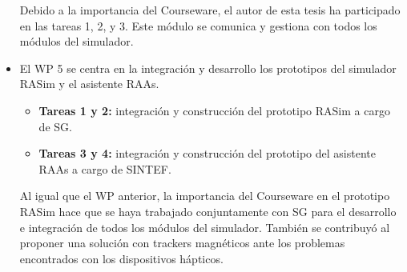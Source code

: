 \begin{itemize}
Debido a la importancia del \ac{Courseware}, el autor de esta tesis ha participado en las tareas 1, 2, y 3. Este módulo se comunica y gestiona con todos los módulos del simulador.%


\item
El \ac{WP} 5 se centra en la integración y desarrollo los prototipos del simulador \ac{RASim} y el asistente \ac{RAAs}. %
\begin{itemize}
    \item {\textbf{Tareas 1 y 2: } integración y construcción del prototipo \ac{RASim} a cargo de \ac{SG}. 
    }
     \item {\textbf{Tareas 3 y 4: } integración y construcción del prototipo del asistente \ac{RAAs} a cargo de \ac{SINTEF}.
    }
\end{itemize}

{Al igual que el \ac{WP} anterior, la importancia del \ac{Courseware} en el prototipo \ac{RASim} hace que se haya trabajado conjuntamente con \ac{SG} para el desarrollo e integración de todos los módulos del simulador. También se contribuyó al proponer una solución con \acs{tracker}s magnéticos ante los problemas encontrados con los dispositivos hápticos.}



\end{itemize}
